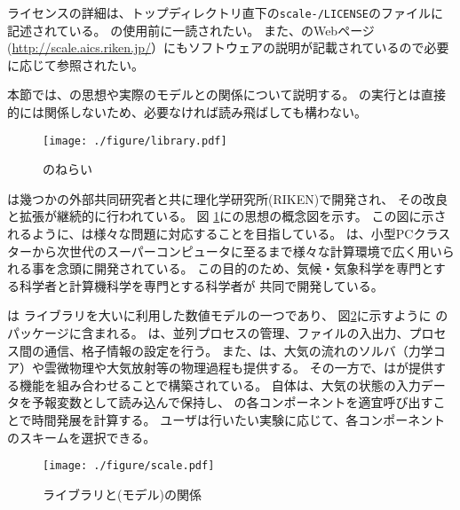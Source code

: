 ライセンスの詳細は、トップディレクトリ直下の\texttt{scale-\version/LICENSE}のファイルに記述されている。
\scalelib の使用前に一読されたい。
また、\scalelib のWebページ(\url{http://scale.aics.riken.jp/}）にもソフトウェアの説明が記載されているので必要に応じて参照されたい。

本節では、\scalelib の思想や実際のモデルとの関係について説明する。
\scalerm の実行とは直接的には関係しないため、必要なければ読み飛ばしても構わない。


\begin{figure}[htb]
\begin{center}
  \texttt{[image: ./figure/library.pdf]}\\
  \caption{\scalelib のねらい}
  \label{fig:scale}
\end{center}
\end{figure}

\scalelib は幾つかの外部共同研究者と共に理化学研究所(RIKEN)で開発され、
その改良と拡張が継続的に行われている。
図 \ref{fig:scale}に\scalelib の思想の概念図を示す。
この図に示されるように、\scalelib は様々な問題に対応することを目指している。
\scalelib は、小型PCクラスターから次世代のスーパーコンピュータに至るまで様々な計算環境で広く用いられる事を念頭に開発されている。
この目的のため、気候・気象科学を専門とする科学者と計算機科学を専門とする科学者が
共同で開発している。

\scalerm は \scalelib ライブラリを大いに利用した数値モデルの一つであり、
図\ref{fig:scale-rm}に示すように \scalelib のパッケージに含まれる。
\scalelib は、並列プロセスの管理、ファイルの入出力、プロセス間の通信、格子情報の設定を行う。
また、\scalelib は、大気の流れのソルバ（力学コア）や雲微物理や大気放射等の物理過程も提供する。
その一方で、\scalerm は\scalelib が提供する機能を組み合わせることで構築されている。
\scalerm 自体は、大気の状態の入力データを予報変数として読み込んで保持し、
\scalelib の各コンポーネントを適宜呼び出すことで時間発展を計算する。
ユーザは行いたい実験に応じて、各コンポーネントのスキームを選択できる。

\begin{figure}[hbt]
\begin{center}
  \texttt{[image: ./figure/scale.pdf]}\\
  \caption{{\scalelib}ライブラリと{\scalerm}(モデル)の関係}
  \label{fig:scale-rm}
\end{center}
\end{figure}



